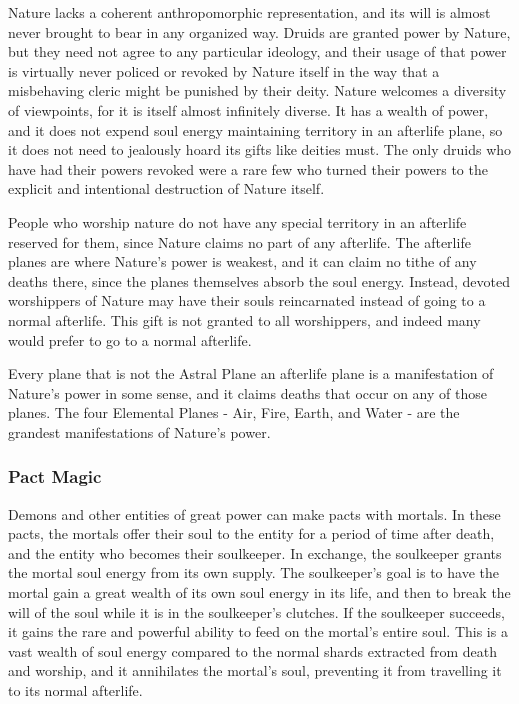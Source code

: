             Nature lacks a coherent anthropomorphic representation, and its will is almost never brought to bear in any organized way.
            Druids are granted power by Nature, but they need not agree to any particular ideology, and their usage of that power is virtually never policed or revoked by Nature itself in the way that a misbehaving cleric might be punished by their deity.
            Nature welcomes a diversity of viewpoints, for it is itself almost infinitely diverse.
            It has a wealth of power, and it does not expend soul energy maintaining territory in an afterlife plane, so it does not need to jealously hoard its gifts like deities must.
            The only druids who have had their powers revoked were a rare few who turned their powers to the explicit and intentional destruction of Nature itself.

            People who worship nature do not have any special territory in an afterlife reserved for them, since Nature claims no part of any afterlife.
            The afterlife planes are where Nature's power is weakest, and it can claim no tithe of any deaths there, since the planes themselves absorb the soul energy.
            Instead, devoted worshippers of Nature may have their souls reincarnated instead of going to a normal afterlife.
            This gift is not granted to all worshippers, and indeed many would prefer to go to a normal afterlife.

            Every plane that is not the Astral Plane an afterlife plane is a manifestation of Nature's power in some sense, and it claims deaths that occur on any of those planes.
            The four Elemental Planes - Air, Fire, Earth, and Water - are the grandest manifestations of Nature's power.

        \subsubsection{Pact Magic}
            Demons and other entities of great power can make pacts with mortals.
            In these pacts, the mortals offer their soul to the entity for a period of time after death, and the entity who becomes their soulkeeper.
            In exchange, the soulkeeper grants the mortal soul energy from its own supply.
            The soulkeeper's goal is to have the mortal gain a great wealth of its own soul energy in its life, and then to break the will of the soul while it is in the soulkeeper's clutches.
            If the soulkeeper succeeds, it gains the rare and powerful ability to feed on the mortal's entire soul.
            This is a vast wealth of soul energy compared to the normal shards extracted from death and worship, and it annihilates the mortal's soul, preventing it from travelling it to its normal afterlife.

